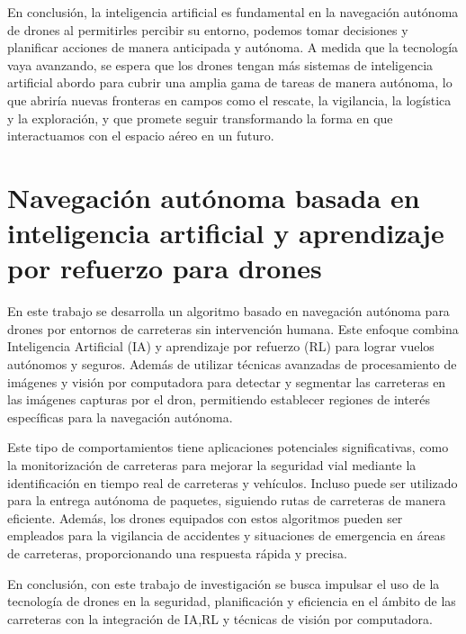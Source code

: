 En conclusión, la inteligencia artificial es fundamental en la navegación autónoma de drones al permitirles percibir su entorno, podemos tomar decisiones y planificar acciones 
de manera anticipada y autónoma. A medida que la tecnología vaya avanzando, se espera que los drones tengan más sistemas de inteligencia artificial abordo para cubrir una amplia gama de tareas
de manera autónoma, lo que abriría nuevas fronteras en campos como el rescate, la vigilancia, la logística y la exploración, y que promete seguir transformando la forma en que 
interactuamos con el espacio aéreo en un futuro. 

\section{Navegación autónoma basada en inteligencia artificial y aprendizaje por refuerzo para drones}
\label{sec:Navegación autónoma}

En este trabajo se desarrolla un algoritmo basado en navegación autónoma para drones por entornos de carreteras sin intervención humana. Este enfoque combina
Inteligencia Artificial (IA) y aprendizaje por refuerzo (RL) para lograr vuelos autónomos y seguros. Además de utilizar técnicas avanzadas de procesamiento de imágenes 
y visión por computadora para detectar y segmentar las carreteras en las imágenes capturas por el dron, permitiendo establecer regiones de interés específicas para la navegación 
autónoma. 

Este tipo de comportamientos tiene aplicaciones potenciales significativas, como la monitorización de carreteras para mejorar la seguridad vial mediante la identificación en tiempo 
real de carreteras y vehículos. Incluso puede ser utilizado para la entrega autónoma de paquetes, siguiendo rutas de carreteras de manera eficiente. Además, los drones equipados 
con estos algoritmos pueden ser empleados para la vigilancia de accidentes y situaciones de emergencia en áreas de carreteras, proporcionando una respuesta rápida y precisa.

En conclusión, con este trabajo de investigación se busca impulsar el uso de la tecnología de drones en la seguridad, planificación y eficiencia en el ámbito de las carreteras con la integración 
de IA,RL y técnicas de visión por computadora.


